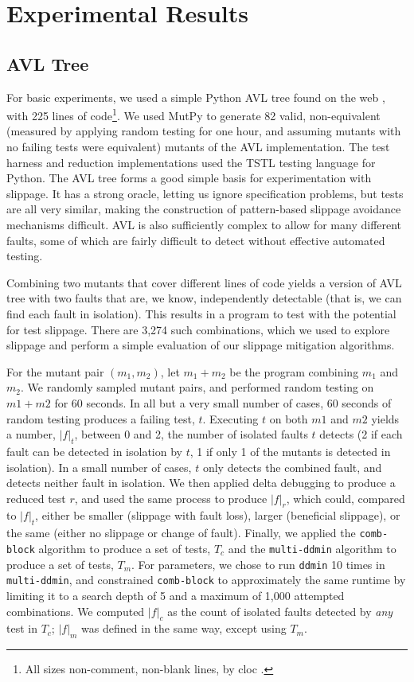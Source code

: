\section {Experimental Results}

\subsection{AVL Tree}

For basic experiments, we used a simple Python AVL tree found on the
web \cite{avltree}, with 225 lines of code\footnote{All sizes
  non-comment, non-blank lines, by cloc \cite{cloc}.}.  We used MutPy
to generate 82 valid, non-equivalent (measured by applying random
testing for one hour, and assuming mutants with no failing tests were
equivalent) mutants of the AVL implementation.  The test harness and
reduction implementations used the TSTL \cite{tstl,ISSTA15,NFM15}
testing language for Python.  The AVL tree forms a good simple basis
for experimentation with slippage.  It has a strong oracle, letting us
ignore specification problems, but tests are all very similar, making
the construction of pattern-based slippage avoidance mechanisms
difficult.  AVL is also sufficiently complex to allow for many different
faults, some of which are fairly difficult to detect without effective
automated testing.

Combining two mutants that cover different lines of code yields a version
of AVL tree with two faults that are, we know, independently
detectable (that is, we can find each fault in isolation).  This
results in a program to test with the potential for test slippage.
There are 3,274 such combinations, which we used to explore slippage
and perform a simple evaluation of our slippage mitigation algorithms.

For the mutant pair $(m_1,m_2)$, let $m_1+m_2$ be the program
combining $m_1$ and $m_2$.  We randomly sampled mutant pairs, and
performed random testing on $m1+m2$ for 60 seconds. In all but a very
small number of cases, 60 seconds of random testing produces a failing
test, $t$.  Executing $t$ on both $m1$ and $m2$ yields a number,
$|f|_t$, between 0 and 2, the number of isolated faults $t$ detects (2
if each fault can be detected in isolation by $t$, 1 if only 1 of the
mutants is detected in isolation).  In a small number of cases, $t$
only detects the combined fault, and detects neither fault in
isolation.  We then applied delta debugging to produce a reduced test
$r$, and used the same process to produce $|f|_r$, which could,
compared to $|f|_t$, either be smaller (slippage with fault loss),
larger (beneficial slippage), or the same (either no slippage or
change of fault).  Finally, we applied the {\tt comb-block} algorithm
to produce a set of tests, $T_c$ and the {\tt multi-ddmin} algorithm
to produce a set of tests, $T_m$.  For parameters, we chose to run
{\tt ddmin} 10 times in {\tt multi-ddmin}, and constrained
{\tt comb-block} to approximately the same runtime by
limiting it to a search depth of 5 and a maximum of 1,000 attempted
combinations.  We computed $|f|_c$ as the count of isolated faults
detected by \emph{any} test in $T_c$; $|f|_m$ was defined in the same
way, except using $T_m$.

